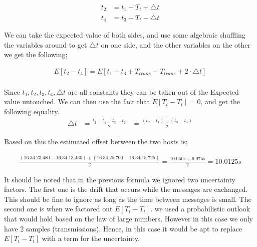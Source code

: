 \documentclass{article}
\begin{document}
\begin{equation}
    \begin{aligned}
        t_2 &= t_1 + T_{t} + \triangle t\\
        t_4 &= t_3 + T_{t} - \triangle t
    \end{aligned}
\end{equation}


We can take the expected value of both sides, and use some algebraic shuffling the variables around to get $\triangle t$ on one side, and the other variables on the other we get the following;

\begin{equation}
    \begin{aligned}
        E[t_2 - t_4] = E[t_1 - t_3 + T_{trans} - T_{trans} + 2\cdot \triangle t] \\
    \end{aligned}
\end{equation}

Since $t_1,t_2,t_3,t_4,\triangle t$ are all constants they can be taken out of the Expected value untouched. 
We can then use the fact that $E[T_t - T_t] = 0$, and get the following equality.
\begin{equation}
    \begin{aligned}
        \triangle t &= \frac{t_2 - t_4 + t_3 - t_1}{2} &= \frac{(t_2 - t_1) + (t_3 - t_4)}{2}
    \end{aligned}
\end{equation}

Based on this the estimated offset between the two hosts is;

\begin{equation}
    \begin{align}
        \frac{(\textit{16:34:23.480}-\textit{16:34:13.430}) + (\textit{16:34:25.700}-\textit{16:34:15.725})}{2}
    = \frac{10.050s + 9.975s}{2} = 10.0125s
\end{align}
\end{equation}

It should be noted that in the previous formula we ignored two uncertainty factors. The first one is the drift that occurs while the messages
are exchanged. This should be fine to ignore as long as the time between messages is small. The second one is when we factored out $E[T_t - T_t]$.
we used a probabilistic outlook that would hold based on the law of large numbers. However in this case we only have 2 samples (transmissions).
Hence, in this case it would be apt to replace $E[T_t - T_t]$ with a term for the uncertainty.
\end{document}
